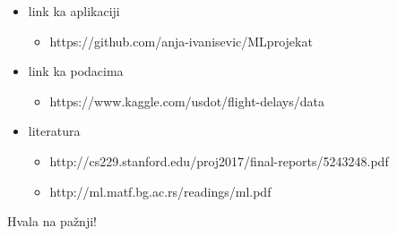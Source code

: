 \documentclass{beamer}
\begin{document}
\begin{frame}
	\begin{itemize}
		\item link ka aplikaciji
			\begin{itemize}
			\item https://github.com/anja-ivanisevic/ML\textunderscore projekat
			\end{itemize}
		\item link ka podacima
			\begin{itemize}
				\item https://www.kaggle.com/usdot/flight-delays/data
			\end{itemize}
		\item literatura
			\begin{itemize}
				\item http://cs229.stanford.edu/proj2017/final-reports/5243248.pdf
    			\item http://ml.matf.bg.ac.rs/readings/ml.pdf
			\end{itemize}
	\end{itemize}
\end{frame}


\begin{frame}{}
    \centering
    Hvala na pažnji!
\end{frame}
\end{document}
